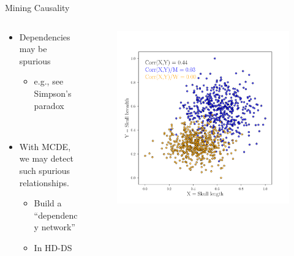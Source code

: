 \documentclass[16pt,usenames,dvipsnames, notheorems]{beamer}
\theoremstyle{definition}
\theoremstyle{example}
\theoremstyle{plain}
\begin{document}
\begin{frame}{Mining Causality}

\begin{columns}
	\begin{column}{0.5\textwidth}
		\begin{itemize}
			\item Dependencies may be spurious
			\begin{itemize}
				\item e.g., see Simpson's paradox
			\end{itemize}
		\end{itemize}
		~\\
		\begin{itemize}
			\item With MCDE, we may detect such spurious relationships. 
			\begin{itemize}
				\item Build a ``dependency network''
				\item In HD-DS 
			\end{itemize}
		\end{itemize}
	\end{column}
	\begin{column}{0.5\textwidth} 
		\begin{figure}
			\includegraphics[width=\linewidth]{figures/simpson_paradox_3-compressed.pdf}
		\end{figure}
	\end{column}
\end{columns}

\end{frame}

\backupend
\end{document}
